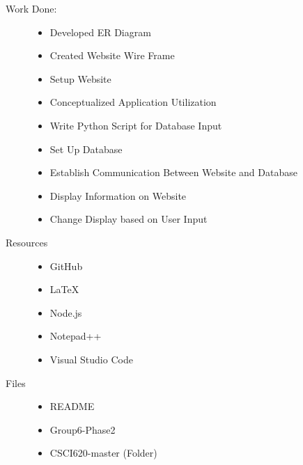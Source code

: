 \documentclass{Group6_Phase2}
\begin{document}
\begin{description}
	\item[Work Done:] \hfill
	\begin{itemize}
		\item Developed ER Diagram
		\item Created Website Wire Frame
		\item Setup Website
		\item Conceptualized Application Utilization
		\item Write Python Script for Database Input
		\item Set Up Database
		\item Establish Communication Between Website and Database
		\item Display Information on Website
		\item Change Display based on User Input
	\end{itemize}
	
	\item[Resources] \hfill
	\begin{itemize}
		\item GitHub
		\item LaTeX
		\item Node.js
		\item Notepad++
		\item Visual Studio Code
	\end{itemize}
	
	\item[Files] \hfill
	\begin{itemize}
		\item README
		\item Group6-Phase2
		\item CSCI620-master (Folder)
	\end{itemize}
\end{description}
\end{document}
